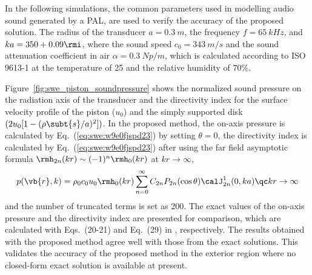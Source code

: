 In the following simulations, the common parameters used in modelling audio sound generated by a PAL, are used to verify the accuracy of the proposed solution. 
The radius of the transducer $a = \SI{0.3}{m}$, the frequency $f = \SI{65}{kHz}$, and $ka = 350 + 0.09\rmi$, where the sound speed $c_0 = \SI{343}{m/s}$ and the sound attenuation coefficient in air $\alpha = \SI{0.3}{Np/m}$, which is calculated according to ISO 9613-1 at the temperature of {25\celsius} and the relative humidity of 70\%.

Figure~\ref{fig:swe_piston_soundpressure} shows the normalized sound pressure on the radiation axis of the transducer and the directivity index for the surface velocity profile of the piston ($u_0$) and the simply supported disk $(2u_0[1 - (\rho\subt{s}/a)^2])$.
In the proposed method, the on-axis pressure is calculated by Eq.~(\ref{eq:swe:w9e0fjspd23}) by setting $\theta = 0$, the directivity index is calculated by Eq.~(\ref{eq:swe:w9e0fjspd23}) after using the far field asymptotic formula $\rmh_{2n}(kr) \sim (-1)^n\rmh_0(kr)$ at $kr\to\infty$, 
\begin{equation}
    p(\vb{r},k)
    =
    \rho_0c_0u_0
    \rmh_0(kr)\sum_{n=0}^\infty
    C_{2n}
    P_{2n}(\cos\theta)
    \calJ_{2n}^1 (0,ka)
    \qc
    kr \to \infty
\end{equation}
and the number of truncated terms is set as 200. The exact values of the on-axis pressure and the directivity index are presented for comparison, which are calculated with Eqs.~(20-21) and Eq.~(29) in \cite{Aarts2009OnaxisFarfieldSound}, respectively. 
The results obtained with the proposed method agree well with those from the exact solutions. 
This validates the accuracy of the proposed method in the exterior region where no closed-form exact solution is available at present. 

